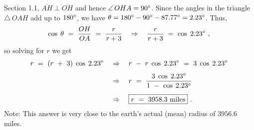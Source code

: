 \begin{exmp}
 Section 1.1, $\overline{AH} \perp \overline{OH}$ and hence
 $\angle\,OHA = 90^\circ$. Since the angles in the triangle $\triangle\,OAH$ add up to
 $180^\circ$, we have $\theta = 180^\circ - 90^\circ - 87.77^\circ = 2.23^\circ$. Thus,
 \begin{displaymath}
  \cos\;\theta ~=~ \frac{OH}{OA} ~=~ \frac{r}{r+3} \quad\Rightarrow\quad \frac{r}{r+3} ~=~
  \cos\;2.23^\circ ~,
 \end{displaymath}
 so solving for $r$ we get
 \begin{align*}
  r ~=~ (r ~+~ 3)\;\cos\;2.23^\circ \quad &\Rightarrow \quad
   r ~-~ r\;\cos\;2.23^\circ ~=~ 3\;\cos\;2.23^\circ\\[4pt]
  &\Rightarrow \quad r ~=~ \frac{3\;\cos\;2.23^\circ}{1 ~-~ \cos\;2.23^\circ}\\[5pt]
  &\Rightarrow \quad \boxed{r ~=~ 3958.3 ~\text{miles}} ~.
 \end{align*}
 Note: This answer is very close to the earth's actual (mean) radius of $3956.6$ miles.
\end{exmp}
\divider
\newpage
